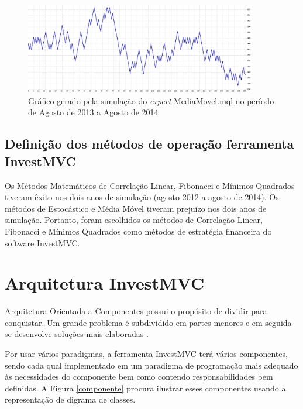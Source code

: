 \begin{figure}[H]
\centering
\includegraphics[width=0.9\textwidth]{figuras/protocoloMedia4}
\caption{ Gráfico gerado pela simulação do \textit{expert} MediaMovel.mql no período de Agosto de 2013 a Agosto de 2014} 
\label{protocoloMedia4}
\end{figure}


\subsection{Definição dos métodos de operação ferramenta InvestMVC}

Os Métodos Matemáticos de Correlação Linear, Fibonacci e Mínimos Quadrados tiveram êxito nos dois anos de simulação (agosto 2012 a agosto de 2014). Os métodos de Estocástico e Média Móvel tiveram prejuízo nos dois anos de simulação. Portanto, foram escolhidos os métodos de Correlação Linear, Fibonacci e Mínimos Quadrados como métodos de estratégia financeira do software InvestMVC.

\section{Arquitetura InvestMVC}

Arquitetura Orientada a Componentes possui o propósito de dividir para conquistar. Um grande problema é subdividido em partes menores e em seguida se desenvolve soluções mais elaboradas \cite{john}.

Por usar vários paradigmas, a ferramenta InvestMVC terá vários componentes, sendo cada qual implementado em um paradigma de programação mais adequado às necessidades do componente bem como contendo responsabilidades bem definidas. A Figura \ref{componente} procura ilustrar esses componentes usando a representação de digrama de classes.

